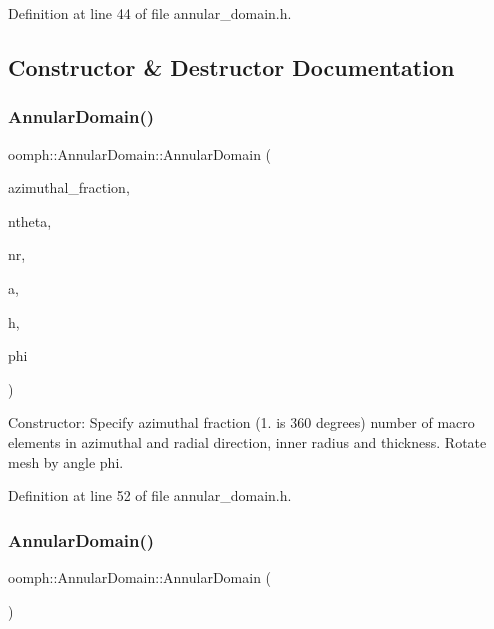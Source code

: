 Definition at line 44 of file annular\+\_\+domain.\+h.



\subsection{Constructor \& Destructor Documentation}
\mbox{\label{classoomph_1_1AnnularDomain_aa0b4ad9d8e63de8aa0dc2d462a016143}} 
\subsubsection{\texorpdfstring{Annular\+Domain()}{AnnularDomain()}\hspace{0.1cm}{\footnotesize\ttfamily [1/2]}}
{\footnotesize\ttfamily oomph\+::\+Annular\+Domain\+::\+Annular\+Domain (\begin{DoxyParamCaption}\item[{const double \&}]{azimuthal\+\_\+fraction,  }\item[{const unsigned \&}]{ntheta,  }\item[{const unsigned \&}]{nr,  }\item[{const double \&}]{a,  }\item[{const double \&}]{h,  }\item[{const double \&}]{phi }\end{DoxyParamCaption})\hspace{0.3cm}{\ttfamily [inline]}}



Constructor\+: Specify azimuthal fraction (1. is 360 degrees) number of macro elements in azimuthal and radial direction, inner radius and thickness. Rotate mesh by angle phi. 



Definition at line 52 of file annular\+\_\+domain.\+h.

\mbox{\label{classoomph_1_1AnnularDomain_ad081791409dc419594d0a64e1c17fb09}} 
\subsubsection{\texorpdfstring{Annular\+Domain()}{AnnularDomain()}\hspace{0.1cm}{\footnotesize\ttfamily [2/2]}}
{\footnotesize\ttfamily oomph\+::\+Annular\+Domain\+::\+Annular\+Domain (\begin{DoxyParamCaption}\item[{const \hyperlink{classoomph_1_1AnnularDomain}{Annular\+Domain} \&}]{ }\end{DoxyParamCaption})\hspace{0.3cm}{\ttfamily [inline]}}



